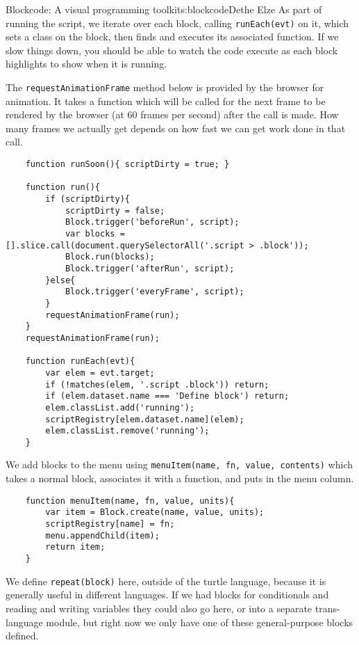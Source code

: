 \begin{aosachapter}{Blockcode: A visual programming toolkit}{s:blockcode}{Dethe Elze}
As part of running the script, we iterate over each block, calling
\texttt{runEach(evt)} on it, which sets a class on the block, then finds
and executes its associated function. If we slow things down, you should
be able to watch the code execute as each block highlights to show when
it is running.

The \texttt{requestAnimationFrame} method below is provided by the
browser for animation. It takes a function which will be called for the
next frame to be rendered by the browser (at 60 frames per second) after
the call is made. How many frames we actually get depends on how fast we
can get work done in that call.

\begin{verbatim}
    function runSoon(){ scriptDirty = true; }

    function run(){
        if (scriptDirty){
            scriptDirty = false;
            Block.trigger('beforeRun', script);
            var blocks = [].slice.call(document.querySelectorAll('.script > .block'));
            Block.run(blocks);
            Block.trigger('afterRun', script);
        }else{
            Block.trigger('everyFrame', script);
        }
        requestAnimationFrame(run);
    }
    requestAnimationFrame(run);

    function runEach(evt){
        var elem = evt.target;
        if (!matches(elem, '.script .block')) return;
        if (elem.dataset.name === 'Define block') return;
        elem.classList.add('running');
        scriptRegistry[elem.dataset.name](elem);
        elem.classList.remove('running');
    }
\end{verbatim}

We add blocks to the menu using
\texttt{menuItem(name, fn, value, contents)} which takes a normal block,
associates it with a function, and puts in the menu column.

\begin{verbatim}
    function menuItem(name, fn, value, units){
        var item = Block.create(name, value, units);
        scriptRegistry[name] = fn;
        menu.appendChild(item);
        return item;
    }
\end{verbatim}

We define \texttt{repeat(block)} here, outside of the turtle language,
because it is generally useful in different languages. If we had blocks
for conditionals and reading and writing variables they could also go
here, or into a separate trans-language module, but right now we only
have one of these general-purpose blocks defined.


\end{aosachapter}

